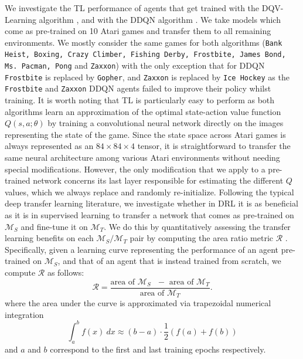We investigate the TL performance of agents that get trained with the DQV-Learning algorithm \citep{sabatelli2018deep}, and with the DDQN algorithm \citep{van2016deep}. We take models which come as pre-trained on 10 Atari games and transfer them to all remaining environments. We mostly consider the same games for both algorithms (\texttt{Bank Heist, Boxing, Crazy Climber, Fishing Derby, Frostbite, James Bond, Ms. Pacman, Pong} and \texttt{Zaxxon}) with the only exception that for DDQN \texttt{Frostbite} is replaced by \texttt{Gopher}, and \texttt{Zaxxon} is replaced by \texttt{Ice Hockey} as the \texttt{Frostbite} and \texttt{Zaxxon} DDQN agents failed to improve their policy whilst training. It is worth noting that TL is particularly easy to perform as both algorithms learn an approximation of the optimal state-action value function $Q(s,a;\theta)$ by training a convolutional neural network directly on the images representing the state of the game. Since the state space across Atari games is always represented as an $84\times84\times4$ tensor, it is straightforward to transfer the same neural architecture among various Atari environments without needing special modifications. However, the only modification that we apply to a pre-trained network concerns its last layer responsible for estimating the different $Q$ values, which we always replace and randomly re-initialize. Following the typical deep transfer learning literature, we investigate whether in DRL it is as beneficial as it is in supervised learning to transfer a network that comes as pre-trained on $\mathcal{M}_S$ and fine-tune it on $\mathcal{M}_T$. We do this by quantitatively assessing the transfer learning benefits on each $\mathcal{M}_S/\mathcal{M}_T$ pair by computing the area ratio metric $\mathscr{R}$ \citep{taylor2009transfer}. Specifically, given a learning curve representing the performance of an agent pre-trained on $\mathcal{M}_S$, and that of an agent that is instead trained from scratch, we compute $\mathscr{R}$ as follows:
\begin{equation}
	\mathscr{R} = \frac{\text{area of $\mathcal{M}_S$ $-$ area of $\mathcal{M}_T$}}{\text{area of $\mathcal{M}_T$}}.
\label{eq:area_ratio_metric}
\end{equation}
where the area under the curve is approximated via trapezoidal numerical integration
\begin{equation}
	\int^{b}_{a}f(x)\:dx \approx(b-a) \cdot \frac{1}{2}(f(a)+f(b))
\end{equation}
and $a$ and $b$ correspond to the first and last training epochs respectively.

